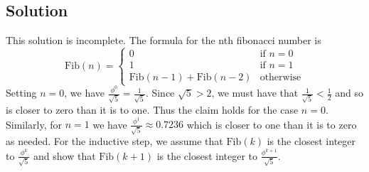 \documentclass[11pt]{article}
\begin{document}
\subsection{Solution}
\label{sec:org4d41060}
This solution is incomplete.
The formula for the nth fibonacci number is
\begin{equation*}
\text{Fib}(n)=
\begin{cases}
0 & \text{if } n = 0 \\
1 & \text{if } n = 1 \\
\text{Fib}(n-1)+\text{Fib}(n-2) & \text{otherwise}
\end{cases}
\end{equation*}
Setting \(n=0\), we have \(\frac{\phi^0}{\sqrt{5}} =
   \frac{1}{\sqrt{5}}\). Since \(\sqrt{5} > 2\), we must have that \(\frac{1}{\sqrt{5}} < \frac{1}{2}\) and so is closer to zero than
it is to one. Thus the claim holds for the case \(n=0\). Similarly,
for \(n=1\) we have \(\frac{\phi^1}{\sqrt{5}} \approx 0.7236\)
which is closer to one than it is to zero as needed. For the
inductive step, we assume that \(\text{Fib}(k)\) is the closest
integer to \(\frac{\phi^k}{\sqrt{5}}\) and show that \(\text{Fib}(k+1)\)
is the closest integer to \(\frac{\phi^{k+1}}{\sqrt{5}}\).
\end{document}
